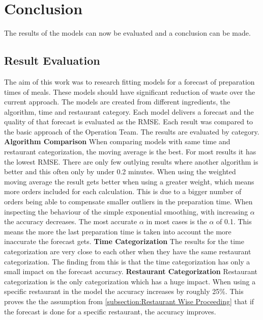 \chapter{Conclusion}\label{chapter:Conclusion}
The results of the models can now be evaluated and a conclusion can be made.
\section{Result Evaluation}
The aim of this work was to research fitting models for a forecast of preparation times of meals. These models should have significant reduction of waste over the current approach.\newline
The models are created from different ingredients, the algorithm, time and restaurant category. Each model delivers a forecast and the quality of that forecast is evaluated as the RMSE. Each result was compared to the basic approach of the Operation Team.\newline
The results are evaluated by category.\newline
\newline\textbf{Algorithm Comparison}\newline
When comparing models with same time and restaurant categorization, the moving average is the best. For most results it has the lowest RMSE. There are only few outlying results where another algorithm is better and this often only by under 0.2 minutes.\newline
When using the weighted moving average the result gets better when using a greater weight, which means more orders included for each calculation. This is due to a bigger number of orders being able to compensate smaller outliers in the preparation time.\newline
When inspecting the behaviour of the simple exponential smoothing, with increasing $\alpha$ the accuracy decreases. The most accurate $\alpha$ in most cases is the $\alpha$ of 0.1. This means the more the last preparation time is taken into account the more inaccurate the forecast gets.
\newline\textbf{Time Categorization}\newline
The results for the time categorization are very close to each other when they have the same restaurant categorization. The finding from this is that the time categorization has only a small impact on the forecast accuracy.
\newline\textbf{Restaurant Categorization}\newline
Restaurant categorization is the only categorization which has a huge impact. When using a specific restaurant in the model the accuracy increases by roughly 25\%. This proves the the assumption from \ref{subsection:Restaurant Wise Proceeding} that if the forecast is done for a specific restaurant, the accuracy improves.
